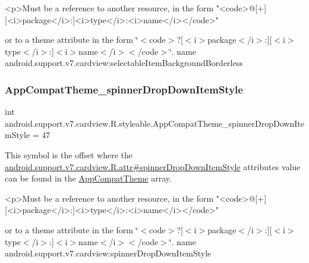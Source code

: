 \begin{DoxyVerb}      <p>Must be a reference to another resource, in the form "<code>@[+][<i>package</i>:]<i>type</i>:<i>name</i></code>"
\end{DoxyVerb}
 or to a theme attribute in the form \char`\"{}$<$code$>$?\mbox{[}$<$i$>$package$<$/i$>$\+:\mbox{]}\mbox{[}$<$i$>$type$<$/i$>$\+:\mbox{]}$<$i$>$name$<$/i$>$$<$/code$>$\char`\"{}.  name android.\+support.\+v7.\+cardview\+:selectable\+Item\+Background\+Borderless \mbox{\label{classandroid_1_1support_1_1v7_1_1cardview_1_1R_1_1styleable_a62e180c1f60defc3fbbb0ef9727b592e}} 
\subsubsection{\texorpdfstring{App\+Compat\+Theme\+\_\+spinner\+Drop\+Down\+Item\+Style}{AppCompatTheme\_spinnerDropDownItemStyle}}
{\footnotesize\ttfamily int android.\+support.\+v7.\+cardview.\+R.\+styleable.\+App\+Compat\+Theme\+\_\+spinner\+Drop\+Down\+Item\+Style = 47\hspace{0.3cm}{\ttfamily [static]}}

This symbol is the offset where the \hyperlink{classandroid_1_1support_1_1v7_1_1cardview_1_1R_1_1attr_a590a37b5fed89c38a8d1e814fd3d61ed}{android.\+support.\+v7.\+cardview.\+R.\+attr\#spinner\+Drop\+Down\+Item\+Style} attribute\textquotesingle{}s value can be found in the \hyperlink{classandroid_1_1support_1_1v7_1_1cardview_1_1R_1_1styleable_a52e6f69f954ecc2622d72c0b4d298938}{App\+Compat\+Theme} array.

\begin{DoxyVerb}      <p>Must be a reference to another resource, in the form "<code>@[+][<i>package</i>:]<i>type</i>:<i>name</i></code>"
\end{DoxyVerb}
 or to a theme attribute in the form \char`\"{}$<$code$>$?\mbox{[}$<$i$>$package$<$/i$>$\+:\mbox{]}\mbox{[}$<$i$>$type$<$/i$>$\+:\mbox{]}$<$i$>$name$<$/i$>$$<$/code$>$\char`\"{}.  name android.\+support.\+v7.\+cardview\+:spinner\+Drop\+Down\+Item\+Style \mbox{\label{classandroid_1_1support_1_1v7_1_1cardview_1_1R_1_1styleable_a79aca90da3f26ef28ad85f5c155d9b49}} 
